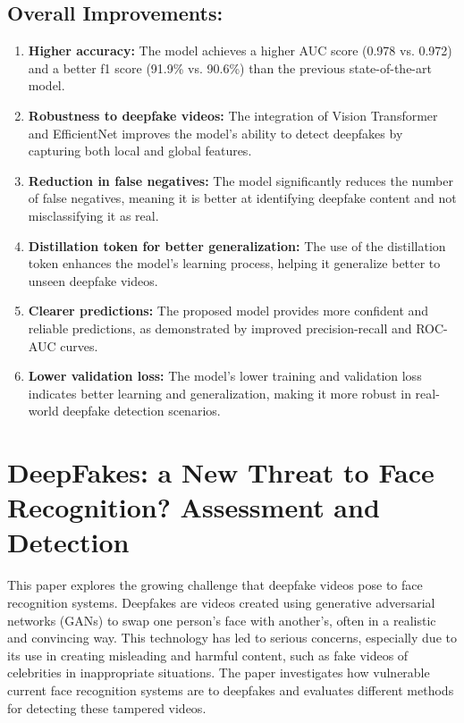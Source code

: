 \documentclass{report}
\begin{document}
	
	
	\section{Overall Improvements:}
	\begin{enumerate}
		\item 
		\textbf{Higher accuracy:} The model achieves a higher AUC score (0.978 vs. 0.972) and a better f1 score (91.9\% vs. 90.6\%) than the previous state-of-the-art model.
		
		\item 
		\textbf{Robustness to deepfake videos:} The integration of Vision Transformer and EfficientNet improves the model's ability to detect deepfakes by capturing both local and global features.
		
		\item 
		\textbf{Reduction in false negatives:} The model significantly reduces the number of false negatives, meaning it is better at identifying deepfake content and not misclassifying it as real.
		
		\item 
		\textbf{Distillation token for better generalization:} The use of the distillation token enhances the model's learning process, helping it generalize better to unseen deepfake videos.
		
		\item 
		\textbf{Clearer predictions:} The proposed model provides more confident and reliable predictions, as demonstrated by improved precision-recall and ROC-AUC curves.
		
		\item 
		\textbf{Lower validation loss:} The model's lower training and validation loss indicates better learning and generalization, making it more robust in real-world deepfake detection scenarios.
	\end{enumerate}
	
	
	
	
	
	
	
	
	
	
	
	
	\chapter{DeepFakes: a New Threat to Face Recognition? Assessment and Detection \cite{DBLP:journals/corr/abs-1812-08685}}
	
	This paper explores the growing challenge that deepfake videos pose to face recognition systems. Deepfakes are videos created using generative adversarial networks (GANs) to swap one person's face with another's, often in a realistic and convincing way. This technology has led to serious concerns, especially due to its use in creating misleading and harmful content, such as fake videos of celebrities in inappropriate situations. The paper investigates how vulnerable current face recognition systems are to deepfakes and evaluates different methods for detecting these tampered videos.
	
\end{document}
